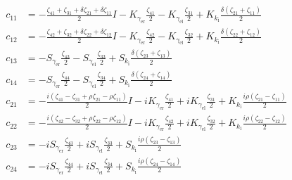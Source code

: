 \begin{align*}
  c_{11} &= -\frac{\zeta_{41}+\zeta_{31}+\delta \zeta_{21}+\delta \zeta_{11}}{2} I-K_{\gamma_\text{er}} \frac{\zeta_{41}}{2}-K_{\gamma_\text{el}} \frac{\zeta_{31}}{2}+K_{k_\text{i}} \frac{\delta(\zeta_{21}+\zeta_{11})}{2} \\
  c_{12} &= -\frac{\zeta_{42}+\zeta_{32}+\delta \zeta_{22}+\delta \zeta_{12}}{2} I-K_{\gamma_\text{er}} \frac{\zeta_{42}}{2}-K_{\gamma_\text{el}} \frac{\zeta_{32}}{2}+K_{k_\text{i}} \frac{\delta(\zeta_{22}+\zeta_{12})}{2} \\
  c_{13} &= -S_{\gamma_\text{er}} \frac{\zeta_{43}}{2}-S_{\gamma_\text{el}} \frac{\zeta_{33}}{2}+S_{k_\text{i}} \frac{\delta(\zeta_{23}+\zeta_{13})}{2}\\
  c_{14} &= -S_{\gamma_\text{er}} \frac{\zeta_{44}}{2}-S_{\gamma_\text{el}} \frac{\zeta_{34}}{2}+S_{k_\text{i}} \frac{\delta(\zeta_{24}+\zeta_{14})}{2} \\
  c_{21} &= -\frac{i(\zeta_{41}-\zeta_{31}+\rho \zeta_{21}-\rho \zeta_{11})}{2} I-i K_{\gamma_\text{er}} \frac{\zeta_{41}}{2}+i K_{\gamma_\text{el}} \frac{\zeta_{31}}{2}+K_{k_\text{i}} \frac{i\rho(\zeta_{21}-\zeta_{11})}{2} \\
  c_{22} &= -\frac{i(\zeta_{42}-\zeta_{32}+\rho \zeta_{22}-\rho \zeta_{12})}{2} I-i K_{\gamma_\text{er}} \frac{\zeta_{42}}{2}+i K_{\gamma_\text{el}} \frac{\zeta_{32}}{2}+K_{k_\text{i}} \frac{i\rho(\zeta_{22}-\zeta_{12})}{2} \\
  c_{23} &= -i S_{\gamma_\text{er}} \frac{\zeta_{43}}{2}+i S_{\gamma_\text{el}} \frac{\zeta_{33}}{2}+S_{k_\text{i}} \frac{i\rho(\zeta_{23}-\zeta_{13})}{2} \\
  c_{24} &= -i S_{\gamma_\text{er}} \frac{\zeta_{44}}{2}+i S_{\gamma_\text{el}} \frac{\zeta_{34}}{2}+S_{k_\text{i}} \frac{i\rho(\zeta_{24}-\zeta_{14})}{2} \\
\end{align*}

